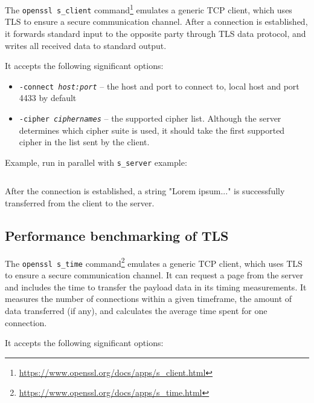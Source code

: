 The \texttt{openssl s\_client} command\footnote{\url{https://www.openssl.org/docs/apps/s\_client.html}} emulates a generic TCP client, which uses TLS to ensure a secure communication channel. After a connection is established, it forwards standard input to the opposite party through TLS data protocol, and writes all received data to standard output.

It accepts the following significant options:

\begin{itemize}
\item \texttt{-connect \textit{host:port}} -- the host and port to connect to, local host and port 4433 by default
\item \texttt{-cipher \textit{ciphernames}} -- the supported cipher list. Although the server determines which cipher suite is used, it should take the first supported cipher in the list sent by the client.
\end{itemize}

Example, run in parallel with \texttt{s\_server} example:

\inputminted{text}{code/openssl-s_client-example.txt}

After the connection is established, a string "Lorem ipsum..." is successfully transferred from the client to the server.


\subsection{Performance benchmarking of TLS}

The \texttt{openssl s\_time} command\footnote{\url{https://www.openssl.org/docs/apps/s\_time.html}} emulates a generic TCP client, which uses TLS to ensure a secure communication channel. It can request a page from the server and includes the time to transfer the payload data in its timing measurements. It measures the number of connections within a given timeframe, the amount of data transferred (if any), and calculates the average time spent for one connection.

It accepts the following significant options:

